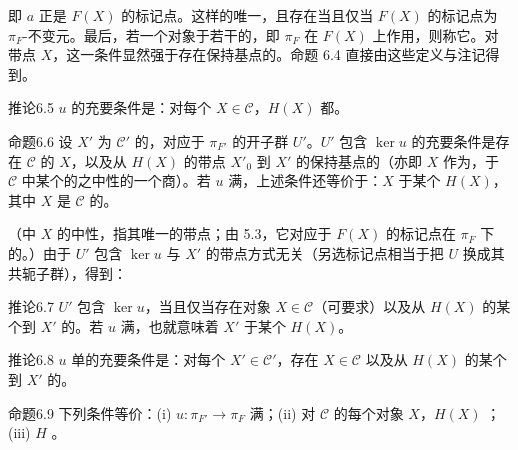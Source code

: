 即 $a$ 正是 $F(X)$ 的标记点。这样的唯一，且存在当且仅当 $F(X)$ 的标记点为 $\pi_F$-不变元。最后，若一个对象于若干的，即 $\pi_F$ 在 $F(X)$ 上作用，则称它。对带点 $X$，这一条件显然强于存在保持基点的。命题 6.4 直接由这些定义与注记得到。
\begin{SGAresult}{推论}{6.5}
$u$ 的充要条件是：对每个 $X\in\mathcal C$，$H(X)$ 都。
\end{SGAresult}
\begin{SGAresult}{命题}{6.6}
设 $X'$ 为 $\mathcal C'$ 的，对应于 $\pi_{F'}$ 的开子群 $U'$。$U'$ 包含 $\ker u$ 的充要条件是存在 $\mathcal C$ 的 $X$，以及从 $H(X)$ 的带点 $X'_0$ 到 $X'$ 的保持基点的（亦即 $X$ 作为，于 $\mathcal C$ 中某个的之中性的一个商）。若 $u$ 满，上述条件还等价于：$X$ 于某个 $H(X)$，其中 $X$ 是 $\mathcal C$ 的。
\end{SGAresult}
（中 $X$ 的中性，指其唯一的带点；由 5.3，它对应于 $F(X)$ 的标记点在 $\pi_F$ 下的。）由于 $U'$ 包含 $\ker u$ 与 $X'$ 的带点方式无关（另选标记点相当于把 $U$ 换成其共轭子群），得到：
\begin{SGAresult}{推论}{6.7}
$U'$ 包含 $\ker u$，当且仅当存在对象 $X\in\mathcal C$（可要求）以及从 $H(X)$ 的某个到 $X'$ 的。若 $u$ 满，也就意味着 $X'$ 于某个 $H(X)$。
\end{SGAresult}
\begin{SGAresult}{推论}{6.8}
$u$ 单的充要条件是：对每个 $X'\in\mathcal C'$，存在 $X\in\mathcal C$ 以及从 $H(X)$ 的某个到 $X'$ 的。
\end{SGAresult}
\begin{SGAresult}{命题}{6.9}
下列条件等价：(i) $u:\pi_{F'}\to\pi_F$ 满；(ii) 对 $\mathcal C$ 的每个对象 $X$，$H(X)$ ；(iii) $H$ 。
\end{SGAresult}
